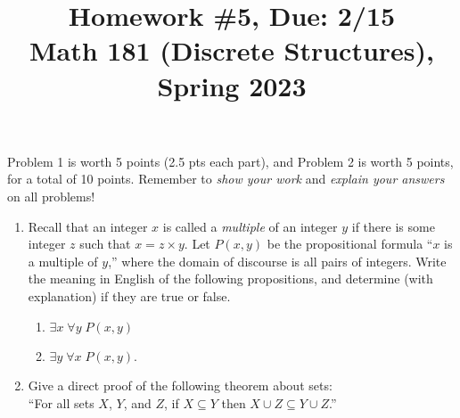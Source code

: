 \documentclass[11pt]{article}
\title{Homework \#5, Due: 2/15 \\Math 181 (Discrete Structures), Spring 2023}
\date{}
\begin{document}
\maketitle

\thispagestyle{empty}

\vspace{-1cm}

Problem 1 is worth 5 points (2.5 pts each part), and Problem 2 is worth 5 points, for a total of 10 points. Remember to \emph{show your work} and \emph{explain your answers} on all problems!

\begin{enumerate}
\item Recall that an integer $x$ is called a \emph{multiple} of an integer $y$ if there is some integer $z$ such that $x = z \times y$. Let $P(x,y)$ be the propositional formula ``$x$ is a multiple of $y$,'' where the domain of discourse is all pairs of integers. Write the meaning in English of the following propositions, and determine (with explanation) if they are true or false.
\begin{enumerate}
\item $\exists x \; \forall y \; P(x,y)$
\item $\exists y \; \forall x \; P(x,y)$.
\end{enumerate}

\item Give a direct proof of the following theorem about sets: \\ ``For all sets $X$, $Y$, and $Z$, if $X\subseteq Y$ then $X\cup Z \subseteq Y \cup Z$.''
\end{enumerate}
\end{document}
